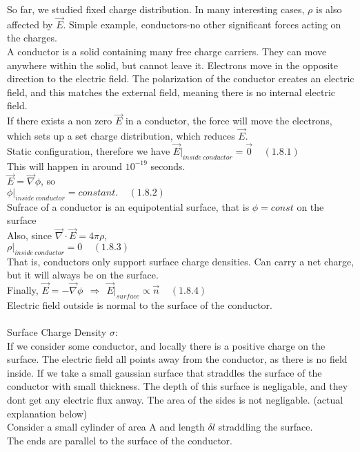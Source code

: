 \documentclass[a4paper,11pt]{article}
\newcommand{\Nab}{\vec{\nabla}}
\newcommand{\dop}[2]{\vec{#1}\cdot\vec{#2}}
\begin{document}
So far, we studied fixed charge distribution. In many interesting cases, $\rho$ is also affected by $\vec{E}$. Simple example, conductors-no other significant forces acting on the charges.\\
A conductor is a solid containing many free charge carriers. They can move anywhere within the solid, but cannot leave it. Electrons move in the opposite direction to the electric field. The polarization of the conductor creates an electric field, and this matches the external field, meaning there is no internal electric field.\\
If there exists a non zero $\vec{E}$ in a conductor, the force will move the electrons, which sets up a set charge distribution, which reduces $\vec{E}$.\\
Static configuration, therefore we have $\vec{E}|_{inside~conductor}=\vec{0}~~~~~(1.8.1)$\\
This will happen in around $10^{-19}$ seconds.\\
$\vec{E}=\Nab\phi$, so\\
$\phi|_{inside~conductor}=constant.~~~~~(1.8.2)$\\
Sufrace of a conductor is an equipotential surface, that is $\phi=const$ on the surface\\
Also, since $\dop{\nabla}{E}=4\pi\rho$,\\
$\rho|_{inside~conductor}=0~~~~~(1.8.3)$\\
That is, conductors only support surface charge densities. Can carry a net charge, but it will always be on the surface.\\
Finally, $\vec{E}=-\Nab\phi~~\Rightarrow~~\vec{E}|_{surface} \propto \vec{n}~~~~~(1.8.4)$\\
Electric field outside is normal to the surface of the conductor.\\
\\
Surface Charge Density $\sigma$:\\
If we consider some conductor, and locally there is a positive charge on the surface. The electric field all points away from the conductor, as there is no field inside. If we take a small gaussian surface that straddles the surface of the conductor with small thickness. The depth of this surface is negligable, and they dont get any electric flux anway. The area of the sides is not negligable. (actual explanation below)\\
Consider a small cylinder of area A and length $\delta l$ straddling the surface.\\
The ends are parallel to the surface of the conductor.\\
\end{document}
